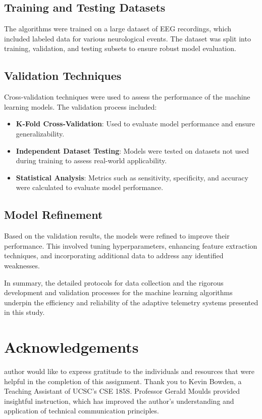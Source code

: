\documentclass[12pt,journal,compsoc]{IEEEtran}
\begin{document}
\subsection{Training and Testing Datasets}
The algorithms were trained on a large dataset of EEG recordings, which included labeled data for various neurological events. The dataset was split into training, validation, and testing subsets to ensure robust model evaluation.

\subsection{Validation Techniques}
Cross-validation techniques were used to assess the performance of the machine learning models. The validation process included:
\begin{itemize}
    \item \textbf{K-Fold Cross-Validation}: Used to evaluate model performance and ensure generalizability.
    \item \textbf{Independent Dataset Testing}: Models were tested on datasets not used during training to assess real-world applicability.
    \item \textbf{Statistical Analysis}: Metrics such as sensitivity, specificity, and accuracy were calculated to evaluate model performance.
\end{itemize}

\subsection{Model Refinement}
Based on the validation results, the models were refined to improve their performance. This involved tuning hyperparameters, enhancing feature extraction techniques, and incorporating additional data to address any identified weaknesses.

In summary, the detailed protocols for data collection and the rigorous development and validation processes for the machine learning algorithms underpin the efficiency and reliability of the adaptive telemetry systems presented in this study.

\section*{Acknowledgements}
 author would like to express gratitude to the individuals and resources that were helpful in the completion of this assignment. Thank you to Kevin Bowden, a Teaching Assistant of UCSC's CSE 185S. Professor Gerald Moulds provided insightful instruction, which has improved the author's understanding and application of technical communication principles. 
\end{document}
